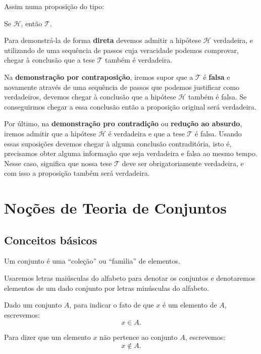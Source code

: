Assim numa proposição do tipo:
\begin{center}
	Se $\mathcal{H}$, ent\~ao $\mathcal{T}$.
\end{center}

Para demonstrá-la de forma \textbf{direta} devemos admitir a hipótese $\mathcal{H}$ verdadeira, e utilizando de uma sequência de passos cuja veracidade podemos comprovar, chegar à conclusão que a tese $\mathcal{T}$ também é verdadeira.

Na \textbf{demonstração por contraposição}, iremos supor que a $\mathcal{T}$ é \textbf{falsa} e novamente através de uma sequência de passos que podemos justificar como verdadeiros, devemos chegar à conclusão que a hipótese $\mathcal{H}$ também é falsa. Se conseguirmos chegar a essa conclusão então a proposição original será verdadeira.

Por último, na \textbf{demonstração pro contradição} ou \textbf{redução ao absurdo}, iremos admitir que a hipótese $\mathcal{H}$ é verdadeira e que a tese $\mathcal{T}$ é falsa. Usando essas suposições devemos chegar à alguma conclusão contraditória, isto é, precisamos obter alguma informação que seja verdadeira e falsa ao mesmo tempo. Nesse caso, significa que nossa tese $\mathcal{T}$ deve ser obrigatoriamente verdadeira, e com isso a proposição também será verdadeira.



\chapter{No{\c c}{\~o}es de Teoria de Conjuntos}
\section{Conceitos b{\'a}sicos}

Um conjunto {\'e} uma ``cole{\c c}{\~a}o'' ou ``fam{\'\i}lia'' de elementos.

Usaremos letras mai{\'u}sculas do alfabeto para denotar os conjuntos e denotaremos elementos de um dado conjunto por letras min{\'u}sculas do alfabeto.

Dado um conjunto $A$, para indicar o fato de que $x$ {\'e} um elemento de $A$, escrevemos:
\[
x \in A.
\]

Para dizer que um elemento $x$ n{\~a}o pertence ao conjunto $A$, escrevemos:
\[
x \notin A.
\]

